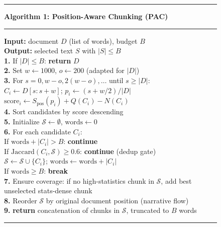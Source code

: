 \documentclass[journal]{IEEEtran}
\begin{document}
\begin{figure}[h]
\centering
\begin{minipage}{0.95\columnwidth}
\rule{\linewidth}{0.8pt}\vspace{-4pt}
\textbf{Algorithm 1: Position-Aware Chunking (PAC)}\\
\label{alg:pac}
\rule{\linewidth}{0.4pt}
\textbf{Input:} document $D$ (list of words), budget $B$\\
\textbf{Output:} selected text $S$ with $|S| \leq B$\\[4pt]
\textbf{1.} If $|D| \leq B$: \textbf{return} $D$\\
\textbf{2.} Set $w \leftarrow 1000$, $o \leftarrow 200$ (adapted for $|D|$)\\
\textbf{3.} For $s = 0, w{-}o, 2(w{-}o), \ldots$ until $s \geq |D|$:\\
\hspace*{1em} $C_i \leftarrow D[s{:}s{+}w]$; $p_i \leftarrow (s + w/2)/|D|$\\
\hspace*{1em} $\text{score}_i \leftarrow S_{\text{pos}}(p_i) + Q(C_i) - N(C_i)$\\
\textbf{4.} Sort candidates by score descending\\
\textbf{5.} Initialize $\mathcal{S} \leftarrow \emptyset$, $\text{words} \leftarrow 0$\\
\textbf{6.} For each candidate $C_i$:\\
\hspace*{1em} If $\text{words} + |C_i| > B$: \textbf{continue}\\
\hspace*{1em} If $\text{Jaccard}(C_i, \mathcal{S}) \geq 0.6$: \textbf{continue} (dedup gate)\\
\hspace*{1em} $\mathcal{S} \leftarrow \mathcal{S} \cup \{C_i\}$; $\text{words} \leftarrow \text{words} + |C_i|$\\
\hspace*{1em} If $\text{words} \geq B$: \textbf{break}\\
\textbf{7.} Ensure coverage: if no high-statistics chunk in $\mathcal{S}$, add best unselected stats-dense chunk\\
\textbf{8.} Reorder $\mathcal{S}$ by original document position (narrative flow)\\
\textbf{9.} \textbf{return} concatenation of chunks in $\mathcal{S}$, truncated to $B$ words\\
\rule{\linewidth}{0.8pt}
\end{minipage}
\end{figure}
\end{document}

